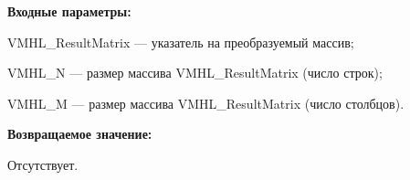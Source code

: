 \textbf{Входные параметры:}

 VMHL\_ResultMatrix --- указатель на преобразуемый массив;
 
 VMHL\_N --- размер массива VMHL\_ResultMatrix (число строк);
 
 VMHL\_M --- размер массива VMHL\_ResultMatrix (число столбцов).

\textbf{Возвращаемое значение:}

 Отсутствует.